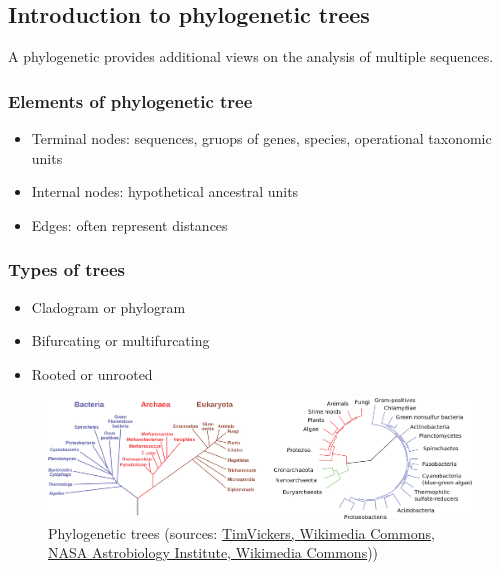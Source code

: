 %
%

%
%
\subsection{Introduction to phylogenetic trees}
A phylogenetic provides additional views on the analysis of multiple sequences.

%
%
\subsubsection*{Elements of phylogenetic tree}
\begin{itemize}
\item Terminal nodes: sequences, gruops of genes, species, operational taxonomic units
\item Internal nodes: hypothetical ancestral units
\item Edges: often represent distances
\end{itemize}

%
%
\subsubsection*{Types of trees}
\begin{itemize}
\item Cladogram or phylogram
\item Bifurcating or multifurcating
\item Rooted or unrooted
\end{itemize}

\begin{figure}[H]
  \centering
      \includegraphics[width=0.75 \textwidth]{fig09/root_unroot_tree_example.png}
  \caption{Phylogenetic trees (sources: \href{https://commons.wikimedia.org/w/index.php?curid=9381199}{TimVickers, Wikimedia Commons}, \href{https://commons.wikimedia.org/w/index.php?curid=1201601}{NASA Astrobiology Institute, Wikimedia Commons}))}
\end{figure}

